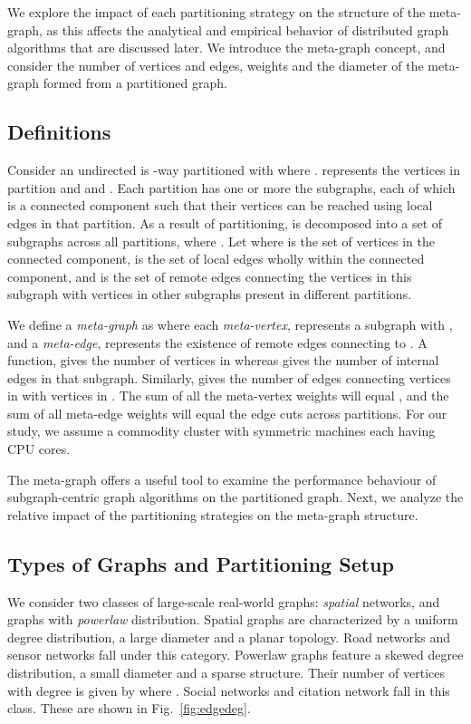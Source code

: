 \documentclass[10pt,conference, compsocconf]{IEEEtran}
\begin{document}
We explore the impact of each partitioning strategy on the structure of the meta-graph, as this affects the analytical and empirical behavior of distributed graph algorithms that are discussed later. We introduce the meta-graph concept, and consider the number of vertices and edges, weights and the diameter of the meta-graph formed from a partitioned graph. 


\subsection{Definitions}
\label{sec:analysis:definition}
Consider an undirected  is -way partitioned with  where .   represents the vertices in partition  and   and  . Each partition  has one or more the subgraphs, each of which is a connected component such that their vertices can be reached using local edges in that partition. As a result of partitioning,  is decomposed into a set of  subgraphs  across all partitions, where . Let  where  is the set of vertices in the connected component,  is the set of local edges wholly within the connected component, and  is the set of remote edges connecting the vertices in this subgraph with vertices in other subgraphs present in different partitions.



We define a \emph{meta-graph} as  where each \emph{meta-vertex},  represents a subgraph  with , and a \emph{meta-edge},  represents the existence of remote edges connecting  to . A function,  gives the number of vertices in  whereas  gives the number of internal edges in that subgraph. Similarly,  gives the number of edges connecting vertices in  with vertices in . The sum of all the meta-vertex weights will equal , and the sum of all meta-edge weights will equal the edge cuts across partitions. For our study, we assume a commodity cluster with  symmetric machines each having  CPU cores.

The meta-graph offers a useful tool to examine the performance behaviour of subgraph-centric graph algorithms on the partitioned graph. Next, we analyze the relative impact of the partitioning strategies on the meta-graph structure.

\subsection{Types of Graphs and Partitioning Setup}
\label{sec:graphs}
We consider two classes of large-scale real-world graphs: \emph{spatial} networks, and graphs with \emph{powerlaw} distribution. Spatial graphs are characterized by a uniform degree distribution, a large diameter and a planar topology. Road networks and sensor networks fall under this category.
Powerlaw graphs feature a skewed degree distribution, a small diameter and a sparse structure. Their number of vertices with degree  is given by  where . Social networks and citation network fall in this class. These are shown in Fig.~\ref{fig:edgedeg}.
\end{document}
